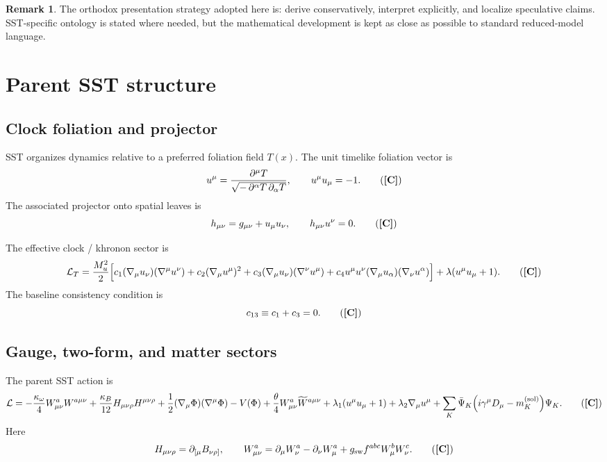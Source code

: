 \documentclass[11pt]{article}
\newcommand{\Lag}{\mathcal{L}}
\newcommand{\TagC}{\textbf{[C]}} %
\theoremstyle{definition}
\newtheorem{remark}[definition]{Remark}
\theoremstyle{plain}
\begin{document}
\begin{remark}
The orthodox presentation strategy adopted here is: derive conservatively, interpret explicitly, and localize speculative claims. SST-specific ontology is stated where needed, but the mathematical development is kept as close as possible to standard reduced-model language.
\end{remark}

\section{Parent SST structure}\label{sec:parent}

\subsection{Clock foliation and projector}

SST organizes dynamics relative to a preferred foliation field \(T(x)\). The unit timelike foliation vector is
\begin{equation}
u^\mu
=
\frac{\partial^\mu T}{\sqrt{-\,\partial^\alpha T\,\partial_\alpha T}},
\qquad
u^\mu u_\mu=-1.
\tag{\TagC}
\label{eq:u}
\end{equation}
The associated projector onto spatial leaves is
\begin{equation}
h_{\mu\nu}=g_{\mu\nu}+u_\mu u_\nu,
\qquad
h_{\mu\nu}u^\nu=0.
\tag{\TagC}
\label{eq:h}
\end{equation}

The effective clock / khronon sector is
\begin{equation}
\Lag_T
=
\frac{M_u^2}{2}
\Big[
c_1(\nabla_\mu u_\nu)(\nabla^\mu u^\nu)
+c_2(\nabla_\mu u^\mu)^2
+c_3(\nabla_\mu u_\nu)(\nabla^\nu u^\mu)
+c_4 u^\mu u^\nu (\nabla_\mu u_\alpha)(\nabla_\nu u^\alpha)
\Big]
+\lambda(u^\mu u_\mu+1).
\tag{\TagC}
\label{eq:LT}
\end{equation}
The baseline consistency condition is
\begin{equation}
c_{13}\equiv c_1+c_3=0.
\tag{\TagC}
\label{eq:c13}
\end{equation}

\subsection{Gauge, two-form, and matter sectors}

The parent SST action is
\begin{equation}
\Lag
=
-\frac{\kappa_\omega}{4}W^a_{\mu\nu}W^{a\mu\nu}
+\frac{\kappa_B}{12}H_{\mu\nu\rho}H^{\mu\nu\rho}
+\frac12(\nabla_\mu\Phi)(\nabla^\mu\Phi)-V(\Phi)
+\frac{\theta}{4}W^a_{\mu\nu}\widetilde{W}^{a\mu\nu}
+\lambda_1(u^\mu u_\mu+1)
+\lambda_2\nabla_\mu u^\mu
+\sum_K \bar{\Psi}_K\!\left(i\gamma^\mu D_\mu-m_K^{(\mathrm{sol})}\right)\!\Psi_K .
\tag{\TagC}
\label{eq:action}
\end{equation}
Here
\begin{equation}
H_{\mu\nu\rho}=\partial_{[\mu}B_{\nu\rho]},
\qquad
W^a_{\mu\nu}
=
\partial_\mu W^a_\nu-\partial_\nu W^a_\mu
+g_{\rm sw}f^{abc}W^b_\mu W^c_\nu .
\tag{\TagC}
\label{eq:HW}
\end{equation}
\end{document}
